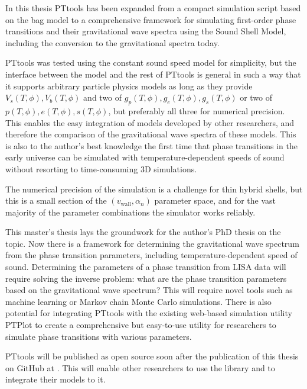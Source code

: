 \iffalse
\begin{itemize}
    \item Briefly discuss the results
    \item Highlight alternative research questions
    \item Put the work in context
    \item etc.
\end{itemize}

"A good thesis should bite itself in the tail"
\fi

In this thesis PTtools has been expanded from a compact simulation script based on the bag model
to a comprehensive framework for simulating first-order phase transitions and their gravitational wave spectra using the Sound Shell Model,
including the conversion to the gravitational spectra today.

PTtools was tested using the constant sound speed model for simplicity,
but the interface between the model and the rest of PTtools is general in such a way
that it supports arbitrary particle physics models as long as they provide $V_s(T,\phi), V_b(T,\phi)$ and two of $g_p(T,\phi), g_e(T,\phi), g_s(T,\phi)$ or two of $p(T,\phi), e(T,\phi), s(T,\phi)$, but preferably all three for numerical precision.
This enables the easy integration of models developed by other researchers,
and therefore the comparison of the gravitational wave spectra of these models.
This is also to the author's best knowledge the first time that phase transitions in the early universe can be simulated with temperature-dependent speeds of sound without resorting to time-consuming 3D simulations.

The numerical precision of the simulation is a challenge for thin hybrid shells,
but this is a small section of the $(v_\text{wall}, \alpha_n)$ parameter space,
and for the vast majority of the parameter combinations the simulator works reliably.

This master's thesis lays the groundwork for the author's PhD thesis on the topic.
Now there is a framework for determining the gravitational wave spectrum from the phase transition parameters, including temperature-dependent speed of sound.
Determining the parameters of a phase transition from LISA data will require solving the inverse problem: what are the phase transition parameters based on the gravitational wave spectrum?
This will require novel tools such as machine learning or Markov chain Monte Carlo simulations.
There is also potential for integrating PTtools with the existing web-based simulation utility PTPlot to create a comprehensive but easy-to-use utility for researchers to simulate phase transitions with various parameters.

PTtools will be published as open source soon after the publication of this thesis on GitHub at \cite{pttools}.
This will enable other researchers to use the library and to integrate their models to it.
